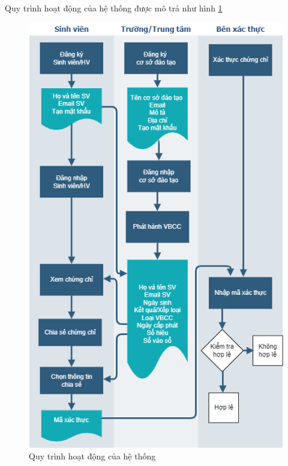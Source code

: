 Quy trình hoạt động của hệ thống được mô trả như hình \ref{fig:vbcc_diagram}

\begin{figure}[htbp]
\centering
\includegraphics[width=.9\linewidth]{img/vbcc_diagram.png}
\caption{Quy trình hoạt động của hệ thống}
\label{fig:vbcc_diagram}
\end{figure}

